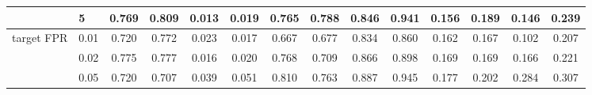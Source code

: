 \begin{table}[!t]
{\begin{tabular}{llcccccccccccc}
 & 5 & 0.769 & 0.809 & 0.013 & 0.019 & 0.765 & 0.788 & 0.846 & 0.941 & 0.156 & 0.189 & 0.146 & 0.239 \\
\midrule
target FPR & 0.01 & 0.720 & 0.772 & 0.023 & 0.017 & 0.667 & 0.677 & 0.834 & 0.860 & 0.162 & 0.167 & 0.102 & 0.207 \\
 & 0.02 & 0.775 & 0.777 & 0.016 & 0.020 & 0.768 & 0.709 & 0.866 & 0.898 & 0.169 & 0.169 & 0.166 & 0.221 \\
 & 0.05 & 0.720 & 0.707 & 0.039 & 0.051 & 0.810 & 0.763 & 0.887 & 0.945 & 0.177 & 0.202 & 0.284 & 0.307 \\
\bottomrule
\end{tabular}}
\end{table}
